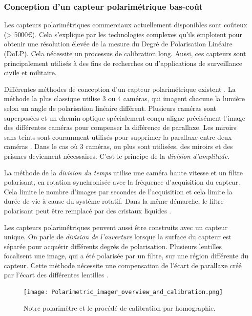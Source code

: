\subsubsection{Conception d'un capteur polarimétrique bas-coût}
Les capteurs polarimétriques commerciaux actuellement disponibles sont coûteux (> 5000€).
Cela s'explique par les technologies complexes qu'ils emploient pour obtenir une résolution élevée de la mesure du Degré de Polarisation Linéaire (DoLP).
Cela nécessite un processus de calibration long.
Aussi, ces capteurs sont principalement utilisés à des fins de recherches ou d'applications de surveillance civile et militaire.

Différentes méthodes de conception d'un capteur polarimétrique existent \cite{tyo_review_2006}.
La méthode la plus classique utilise 3 ou 4 caméras, qui imagent chacune la lumière selon un angle de polarisation linéaire différent.
Plusieurs caméras sont superposées et un chemin optique spécialement conçu aligne précisément l'image des différentes caméras pour compenser la différence de parallaxe.
Les miroirs sans-teints sont couramment utilisés pour supprimer la parallaxe entre deux caméras \cite{wolff_polarization_1995}.
Dans le cas où 3 caméras, ou plus sont utilisées, des miroirs et des prismes deviennent nécessaires.
C'est le principe de la \textit{division d'amplitude}.

La méthode de la \textit{division du temps} utilise une caméra haute vitesse et un filtre polarisant, en rotation synchronisée avec la fréquence d'acquisition du capteur.
Cela limite le nombre d'images par secondes de l'acquisition et cela limite la durée de vie à cause du système rotatif.
Dans la même démarche, le filtre polarisant peut être remplacé par des cristaux liquides \cite{gendre_full_2011}.

Les capteurs polarimétriques peuvent aussi être construits avec un capteur unique.
On parle de \textit{division de l'ouverture} lorsque la surface du capteur est séparée pour acquérir différents degrés de polarisation.
Plusieurs lentilles focalisent une image, qui a été polarisée par un filtre, sur une région différente du capteur.
Cette méthode nécessite une compensation de l'écart de parallaxe créé par l'écart des différentes lentilles \cite{riou_calibration_2015}.  %

\begin{figure}[bht]
	\centering
	\texttt{[image: Polarimetric\_imager\_overview\_and\_calibration.png]}
	\caption{Notre polarimètre et le procédé de calibration par homographie.}
	\label{fig:sensor}
\end{figure}

